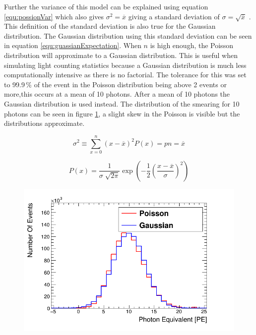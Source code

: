 Further the variance of this model can be explained using equation  \ref{equ:possionVar} which also gives $\sigma^2 = \overline{x}$ giving a standard deviation of $\sigma = \sqrt{\overline{x}}$ \cite{knoll_2010}. This definition of the standard deviation is also true for the Gaussian distribution. The Gaussian distribution using this standard deviation can be seen in equation \ref{equ:guassianExpectation}. When $n$ is high enough, the Poisson distribution will approximate to a Gaussian distribution. This is useful when simulating light counting statistics because a Gaussian distribution is much less computationally intensive as there is no factorial. The tolerance for this was set to 99.9\,\% of the event in the Poisson distribution being above 2 events or more,this occurs at a mean of 10 photons. After a mean of 10 photons the Gaussian distribution is used instead. The distribution of the smearing for 10 photons can be seen in figure \ref{fig:CoutingStats10}, a slight skew in the Poisson is visible but the distributions approximate.

\begin{equation}
\sigma ^2 \equiv \sum_{x=0}^{n} (x-\overline{x})^2 P(x) = pn = \overline{x} 
\label{equ:possionVar}
\end{equation}

\begin{equation}
P(x) = \frac{1}{\sigma \sqrt[]{2 \pi}} \exp \left(-\frac{1}{2}\left(\frac{x-\overline{x}}{\sigma}\right)^{2}\right)
\label{equ:guassianExpectation}
\end{equation}

\begin{figure}[!h]
 \centering
 \includegraphics[width=0.7\linewidth]{Chapter4/Figs/poissionGaussian10Graph.png}
 \label{fig:CoutingStats10}
\end{figure}

